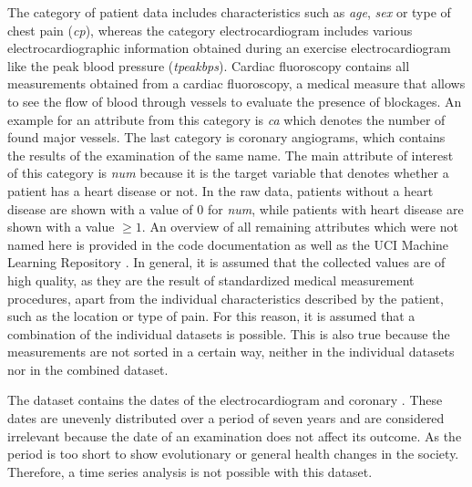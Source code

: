 The category of patient data includes characteristics such as \textit{age}, \textit{sex} or type of chest pain (\textit{cp}), whereas the category electrocardiogram includes various electrocardiographic information obtained during an exercise electrocardiogram like the peak blood pressure (\textit{tpeakbps}). Cardiac fluoroscopy contains all measurements obtained from a cardiac fluoroscopy, a medical measure that allows to see the flow of blood through vessels to evaluate the presence of blockages. An example for an attribute from this category is \textit{ca} which denotes the number of found major vessels. The last category is coronary angiograms, which contains the results of the examination of the same name. The main attribute of interest of this category is \textit{num} because it is the target variable that denotes whether a patient has a heart disease or not. In the raw data, patients without a heart disease are shown with a value of 0 for \textit{num}, while patients with heart disease are shown with a value  $\geq 1$.
An overview of all remaining attributes which were not named here is provided in the code documentation as well as the UCI Machine Learning Repository \citep{janosi1988}. In general, it is assumed that the collected values are of high quality, as they are the result of standardized medical measurement procedures, apart from the individual characteristics described by the patient, such as the location or type of pain. For this reason, it is assumed that a combination of the individual datasets is possible. This is also true because the measurements are not sorted in a certain way, neither in the individual datasets nor in the combined dataset.

The dataset contains the dates of the electrocardiogram and coronary . These dates are unevenly distributed over a period of seven years and are considered irrelevant because the date of an examination does not affect its outcome. As the period is too short to show evolutionary or general health changes in the society. Therefore, a time series analysis is not possible with this dataset.

